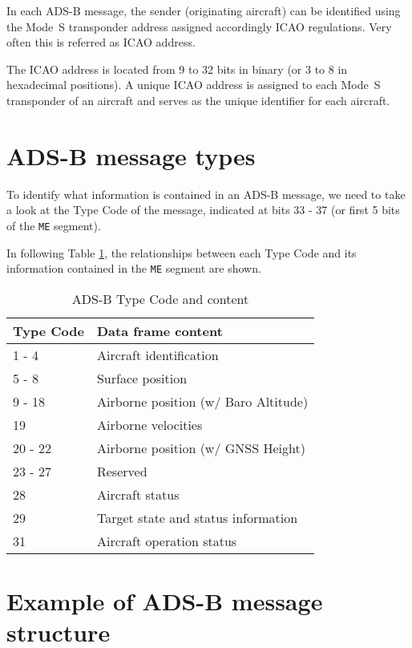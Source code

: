 In each ADS-B message, the sender (originating aircraft) can be identified using the Mode~S transponder address assigned accordingly ICAO regulations. Very often this is referred as ICAO address. 

The ICAO address is located from 9 to 32 bits in binary (or 3 to 8 in hexadecimal positions). A unique ICAO address is assigned to each Mode~S transponder of an aircraft and serves as the unique identifier for each aircraft.


\section{ADS-B message types}

To identify what information is contained in an ADS-B message, we need to take a look at the Type Code of the message, indicated at bits 33 - 37 (or first 5 bits of the \texttt{ME} segment).

In following Table \ref{tb:adsb-tc}, the relationships between each Type Code and its information contained in the \texttt{ME} segment are shown.

\begin{table}[ht]
\centering
\caption{ADS-B Type Code and content}
\label{tb:adsb-tc}
\begin{tabular}{|l|l|}
\hline
\textbf{Type Code} & \textbf{Data frame content} \\  \hline \hline
1 - 4     & Aircraft identification              \\  \hline
5 - 8     & Surface position                     \\  \hline
9 - 18    & Airborne position (w/ Baro Altitude) \\  \hline
19        & Airborne velocities                  \\  \hline
20 - 22   & Airborne position (w/ GNSS Height)   \\  \hline
23 - 27   & Reserved                             \\  \hline
28        & Aircraft status                      \\  \hline
29        & Target state and status information  \\  \hline
31        & Aircraft operation status            \\  \hline
\end{tabular}
\end{table}


\section{Example of ADS-B message structure}

